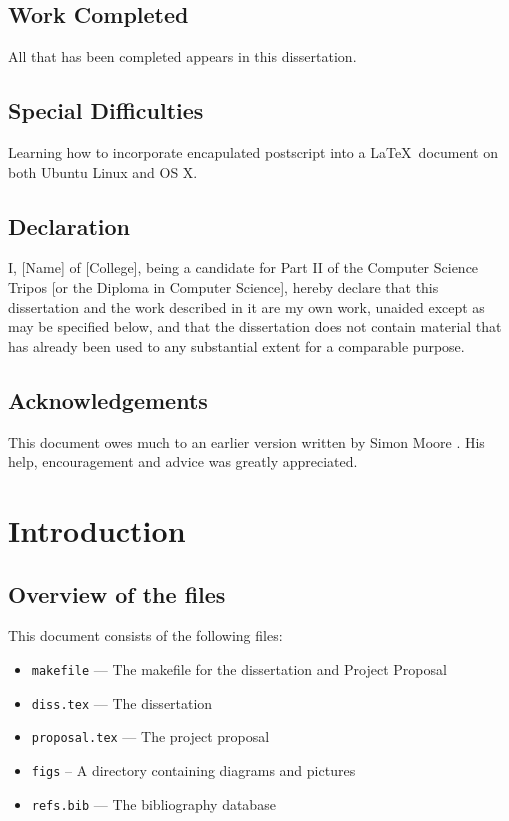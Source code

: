 \documentclass[12pt,a4paper,twoside,openright]{report}
\begin{document}
\section*{Work Completed}
All that has been completed appears in this dissertation.
\section*{Special Difficulties}
Learning how to incorporate encapulated postscript into a \LaTeX\
document on both Ubuntu Linux and OS X.
\newpage
\section*{Declaration}
I, [Name] of [College], being a candidate for Part II of the Computer
Science Tripos [or the Diploma in Computer Science], hereby declare
that this dissertation and the work described in it are my own work,
unaided except as may be specified below, and that the dissertation
does not contain material that has already been used to any substantial
extent for a comparable purpose.
\bigskip
{}
\medskip
{}
\tableofcontents
\listoffigures
\newpage
\section*{Acknowledgements}
This document owes much to an earlier version written by Simon Moore
\cite{Moore95}. His help, encouragement and advice was greatly
appreciated.
\pagestyle{headings}
\chapter{Introduction}
\section{Overview of the files}
This document consists of the following files:
\begin{itemize}
\item \texttt{makefile} --- The makefile for the dissertation and
Project Proposal
\item \texttt{diss.tex} --- The dissertation
\item \texttt{proposal.tex} --- The project proposal
\item \texttt{figs} -- A directory containing diagrams and pictures
\item \texttt{refs.bib} --- The bibliography database
\end{itemize}
\end{document}

